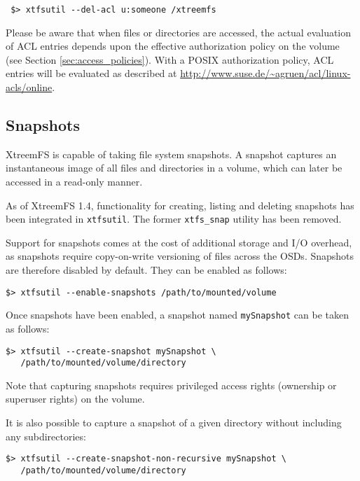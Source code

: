 \documentclass[a4paper,10pt]{book}
\begin{document}
\begin{verbatim}
 $> xtfsutil --del-acl u:someone /xtreemfs
\end{verbatim}

Please be aware that when files or directories are accessed, the actual evaluation of ACL entries depends upon the effective authorization policy on the volume (see Section \ref{sec:access_policies}). With a POSIX authorization policy, ACL entries will be evaluated as described at \href{http://www.suse.de/~agruen/acl/linux-acls/online}{http://www.suse.de/\~{}agruen/acl/linux-acls/online}.

\subsection{Snapshots}

XtreemFS is capable of taking file system snapshots. A snapshot captures an instantaneous image of all files and directories in a volume, which can later be accessed in a read-only manner.

As of XtreemFS 1.4, functionality for creating, listing and deleting snapshots has been integrated in \texttt{xtfsutil}. The former \texttt{xtfs\_snap} utility has been removed.

Support for snapshots comes at the cost of additional storage and I/O overhead, as snapshots require copy-on-write versioning of files across the OSDs. Snapshots are therefore disabled by default. They can be enabled as follows:

\begin{verbatim}
$> xtfsutil --enable-snapshots /path/to/mounted/volume
\end{verbatim}

Once snapshots have been enabled, a snapshot named \texttt{mySnapshot} can be taken as follows:

\begin{verbatim}
$> xtfsutil --create-snapshot mySnapshot \
   /path/to/mounted/volume/directory
\end{verbatim}

Note that capturing snapshots requires privileged access rights (ownership or superuser rights) on the volume.

It is also possible to capture a snapshot of a given directory without including any subdirectories:

\begin{verbatim}
$> xtfsutil --create-snapshot-non-recursive mySnapshot \
   /path/to/mounted/volume/directory
\end{verbatim}
\end{document}
